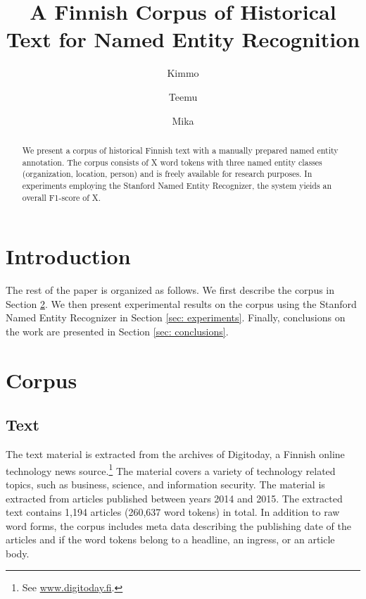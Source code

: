\documentclass[11pt]{article}
\begin{document}
\title{A Finnish Corpus of Historical Text for Named Entity Recognition}
\author{Kimmo \and Teemu  \and Mika}

\maketitle


\begin{abstract}
\noindent We present a corpus of historical Finnish text with a manually prepared named entity annotation. The corpus consists of  X word tokens with three named entity classes (organization, location, person) and is freely available for research purposes. In experiments employing the Stanford Named Entity Recognizer, the system yieids an overall F1-score of X. 

\end{abstract}

\section{Introduction}
\label{sec: introduction}


The rest of the paper is organized as follows. We first describe the corpus in Section \ref{sec: corpus}. We then present experimental results on the corpus using the Stanford Named Entity Recognizer in Section \ref{sec: experiments}. Finally, conclusions on the work are presented in Section \ref{sec: conclusions}.




\section{Corpus}
\label{sec: corpus}

\subsection{Text}
\label{sec: text}

The text material is extracted from the archives of Digitoday, a Finnish online technology news source.\footnote{See \url{www.digitoday.fi}.} The material covers a variety of technology related topics, such as business, science, and information security.  The material is extracted from articles published between years 2014 and 2015. The extracted text contains 1,194 articles (260,637 word tokens) in total. 
In addition to raw word forms, the corpus includes meta data describing the publishing date of the articles and if the word tokens belong to a headline, an ingress, or an article body. 
\end{document}
